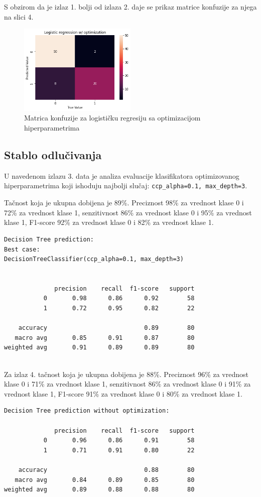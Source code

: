 \documentclass[fontsize=12bp, paper=a4]{scrarticle}
\begin{document}
S obzirom da je izlaz 1. bolji od izlaza 2. daje se prikaz matrice konfuzije za njega na slici 4.
\begin{figure}[h!]
    \centering
    \includegraphics[width=0.5\textwidth]{33}
    \caption{Matrica konfuzije za logističku regresiju sa optimizacijom hiperparametrima}
\end{figure}

\subsection{Stablo odlučivanja}
U navedenom izlazu 3. data je analiza evaluacije klasifikatora 
 optimizovanog hiperparametrima koji ishoduju najbolji slučaj: \verb|ccp_alpha=0.1, max_depth=3|.

 Tačnost koja je ukupna dobijena je 89\%. Preciznost 98\% za vrednost klase 0 i 72\% za vrednost klase 1, senzitivnost 86\% za vrednost klase 0 i 95\% za vrednost klase 1, F1-score 92\% za vrednost klase 0 i 82\% za vrednost klase 1.
\begin{lstlisting}[caption=Stablo odlučivanja sa optimizacijom hiperparametara]
Decision Tree prediction:
Best case:
DecisionTreeClassifier(ccp_alpha=0.1, max_depth=3)


              precision    recall  f1-score   support
           0       0.98      0.86      0.92        58
           1       0.72      0.95      0.82        22

    accuracy                           0.89        80
   macro avg       0.85      0.91      0.87        80
weighted avg       0.91      0.89      0.89        80


\end{lstlisting}

Za izlaz 4. tačnost koja je ukupna dobijena je 88\%. Preciznost 96\% za vrednost klase 0 i 71\% za vrednost klase 1, senzitivnost 86\% za vrednost klase 0 i 91\% za vrednost klase 1, F1-score 91\% za vrednost klase 0 i 80\% za vrednost klase 1.

\begin{lstlisting}[caption=Stablo odlučivanja bez optimizacija hiperparametara]
Decision Tree prediction without optimization:

              precision    recall  f1-score   support
           0       0.96      0.86      0.91        58
           1       0.71      0.91      0.80        22

    accuracy                           0.88        80
   macro avg       0.84      0.89      0.85        80
weighted avg       0.89      0.88      0.88        80
\end{lstlisting}
\end{document}
